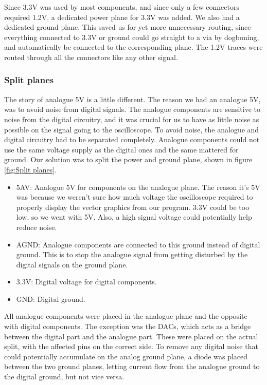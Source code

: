 Since 3.3V was used by most components, and since only a few connectors required 1.2V, a dedicated power plane for 3.3V was added.
We also had a dedicated ground plane.
This saved us for yet more unnecessary routing, since everything connected to 3.3V or ground could go straight to a via by dogboning, and automatically be connected to the corresponding plane. The 1.2V traces were routed through all the connectors like any other signal. 

\subsubsection{Split planes}
The story of analogue 5V is a little different. The reason we had an analogue 5V, was to avoid noise from digital signals. The analogue components are sensitive to noise from the digital circuitry, and it was crucial for us to have as little noise as possible on the signal going to the oscilloscope. 
To avoid noise, the analogue and digital circuitry had to be separated completely. Analogue components could not use the same voltage supply as the digital ones and the same mattered for ground.
\newline
\newline
Our solution was to split the power and ground plane, shown in figure \ref{fig:Split planes}. 
\begin{itemize}
\item 5AV: Analogue 5V for components on the analogue plane. The reason it's 5V was because we weren't sure how much voltage the oscilloscope required to properly display the vector graphics from our program. 3.3V could be too low, so we went with 5V. Also, a high signal voltage could potentially help reduce noise.
\item AGND: Analogue components are connected to this ground instead of digital ground. This is to stop the analogue signal from getting disturbed by the digital signals on the ground plane.
\item 3.3V: Digital voltage for digital components.
\item GND: Digital ground.
\end{itemize}
All analogue components were placed in the analogue plane and the opposite with digital components. The exception was the DACs, which acts as a bridge between the digital part and the analogue part. These were placed on the actual split, with the affected pins on the correct side.
\newline
To remove any digital noise that could potentially accumulate on the analog ground plane, a diode was placed between the two ground planes, letting current flow from the analogue ground to the digital ground, but not vice versa.

